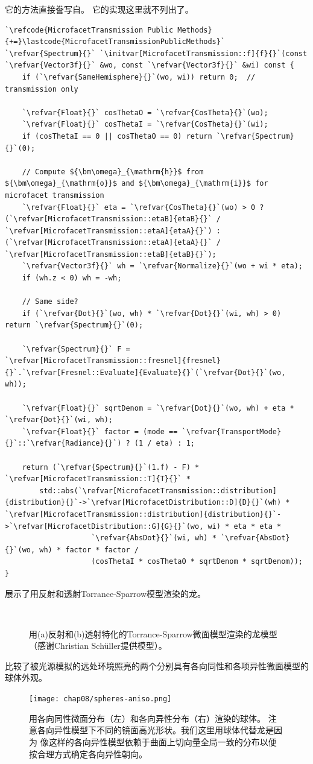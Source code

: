 它的方法直接誊写自。
它的实现这里就不列出了。
\begin{lstlisting}
`\refcode{MicrofacetTransmission Public Methods}{+=}\lastcode{MicrofacetTransmissionPublicMethods}`
`\refvar{Spectrum}{}` `\initvar[MicrofacetTransmission::f]{f}{}`(const `\refvar{Vector3f}{}` &wo, const `\refvar{Vector3f}{}` &wi) const {
    if (`\refvar{SameHemisphere}{}`(wo, wi)) return 0;  // transmission only

    `\refvar{Float}{}` cosThetaO = `\refvar{CosTheta}{}`(wo);
    `\refvar{Float}{}` cosThetaI = `\refvar{CosTheta}{}`(wi);
    if (cosThetaI == 0 || cosThetaO == 0) return `\refvar{Spectrum}{}`(0);

    // Compute ${\bm\omega}_{\mathrm{h}}$ from ${\bm\omega}_{\mathrm{o}}$ and ${\bm\omega}_{\mathrm{i}}$ for microfacet transmission
    `\refvar{Float}{}` eta = `\refvar{CosTheta}{}`(wo) > 0 ? (`\refvar[MicrofacetTransmission::etaB]{etaB}{}` / `\refvar[MicrofacetTransmission::etaA]{etaA}{}`) : (`\refvar[MicrofacetTransmission::etaA]{etaA}{}` / `\refvar[MicrofacetTransmission::etaB]{etaB}{}`);
    `\refvar{Vector3f}{}` wh = `\refvar{Normalize}{}`(wo + wi * eta);
    if (wh.z < 0) wh = -wh;

    // Same side?
    if (`\refvar{Dot}{}`(wo, wh) * `\refvar{Dot}{}`(wi, wh) > 0) return `\refvar{Spectrum}{}`(0);

    `\refvar{Spectrum}{}` F = `\refvar[MicrofacetTransmission::fresnel]{fresnel}{}`.`\refvar[Fresnel::Evaluate]{Evaluate}{}`(`\refvar{Dot}{}`(wo, wh));

    `\refvar{Float}{}` sqrtDenom = `\refvar{Dot}{}`(wo, wh) + eta * `\refvar{Dot}{}`(wi, wh);
    `\refvar{Float}{}` factor = (mode == `\refvar{TransportMode}{}`::`\refvar{Radiance}{}`) ? (1 / eta) : 1;

    return (`\refvar{Spectrum}{}`(1.f) - F) * `\refvar[MicrofacetTransmission::T]{T}{}` *
        std::abs(`\refvar[MicrofacetTransmission::distribution]{distribution}{}`->`\refvar[MicrofacetDistribution::D]{D}{}`(wh) * `\refvar[MicrofacetTransmission::distribution]{distribution}{}`->`\refvar[MicrofacetDistribution::G]{G}{}`(wo, wi) * eta * eta *
                    `\refvar{AbsDot}{}`(wi, wh) * `\refvar{AbsDot}{}`(wo, wh) * factor * factor /
                    (cosThetaI * cosThetaO * sqrtDenom * sqrtDenom));
}
\end{lstlisting}

展示了用反射和透射Torrance-Sparrow模型渲染的龙。
\begin{figure}[htbp]
    \centering
    \\
    \caption{用(a)反射和(b)透射特化的Torrance-Sparrow微面模型渲染的龙模型（感谢Christian Schüller提供模型）。}
    \label{fig:8.21}
\end{figure}

比较了被光源模拟的远处环境照亮的两个分别具有各向同性和各项异性微面模型的球体外观。
\begin{figure}[htbp]
    \centering
    \texttt{[image: chap08/spheres-aniso.png]}
    \caption{用各向同性微面分布（左）和各向异性分布（右）渲染的球体。
    注意各向异性模型下不同的镜面高光形状。我们这里用球体代替龙是因为
    像这样的各向异性模型依赖于曲面上切向量全局一致的分布以便按合理方式确定各向异性朝向。}
    \label{fig:8.22}
\end{figure}

